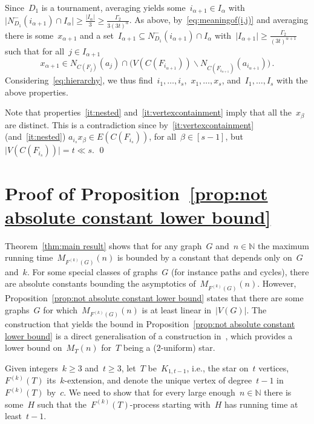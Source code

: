 \documentclass[oneside, 12pt]{amsart}
\numberwithin{equation}{section}
\numberwithin{figure}{section}
\let\setminus=\smallsetminus
\theoremstyle{plain}
\theoremstyle{note}
\theoremstyle{remark}
\begin{document}
    Since~$D_1$ is a tournament, averaging yields some~$i_{\alpha+1}\in I_{\alpha}$ with~$\vert N_{D_1}^-(i_{\alpha+1})\cap I_{\alpha}\vert\geq\frac{\vert I_{\alpha}\vert}{3}\geq\frac{\Gamma_2}{3(3t)^{\alpha}}$.
    As above, by~\eqref{eq:meaningof(i,j)} and averaging there is some~$x_{\alpha+1}$ and a set~$I_{\alpha+1}\subseteq N_{D_1}^-(i_{\alpha+1})\cap I_{\alpha}$ with~$\vert I_{\alpha+1}\vert\geq\frac{\Gamma_2}{(3t)^{\alpha+1}}$ such that for all~$j\in I_{\alpha+1}$ $$x_{\alpha+1}\in N_{C(F_j)}(a_j)\cap\big(V(C(F_{i_{\alpha+1}}))\setminus N_{C(F_{i_{\alpha+1}})}(a_{i_{\alpha+1}})\big)\,.$$
    Considering~\eqref{eq:hierarchy}, we thus find~$i_1,\dots,i_s$,~$x_1,\dots,x_s$, and~$I_1,\dots,I_s$ with the above properties.

    Note that properties~\eqref{it:nested} and~\eqref{it:vertexcontainment} imply that all the~$x_{\beta}$ are distinct.
    This is a contradiction since by~\eqref{it:vertexcontainment} (and~\eqref{it:nested}) $a_{i_s}x_{\beta}\in E(C(F_{i_s}))$, for all~$\beta\in[s-1]$, but~$\vert V(C(F_{i_s}))\vert=t\ll s$.
    \qed
	
	\section{Proof of Proposition~\ref{prop:not absolute constant lower bound}}\label{sec:prop}
	
	Theorem~\ref{thm:main result} shows that for any graph~$G$ and~$n\in\mathds{N}$ the maximum running time~$M_{F^{(k)}(G)}(n)$ is bounded by a constant that depends only on~$G$ and~$k$.
    For some special classes of graphs~$G$ (for instance paths and cycles), there are absolute constants bounding the asymptotics of~$M_{F^{(k)}(G)}(n)$.
    However, Proposition~\ref{prop:not absolute constant lower bound} states that there are some graphs~$G$ for which~$M_{F^{(k)}(G)}(n)$ is at least linear in~$\vert V(G)\vert$.
    The construction that yields the bound in Proposition~\ref{prop:not absolute constant lower bound} is a direct generalisation of a construction in~\cite{FMS:25}, which provides a lower bound on~$M_T(n)$ for~$T$ being a ($2$-uniform) star.
	
    Given integers~$k\geq3$ and~$t\geq 3$, let~$T$ be~$K_{1,t-1}$, i.e., the star on~$t$ vertices,~$F^{(k)}(T)$ its~$k$-extension, and denote the unique vertex of degree~$t-1$ in~$F^{(k)}(T)$ by~$c$.
    We need to show that for every large enough~$n\in\mathds{N}$ there is some~$H$ such that the~$F^{(k)}(T)$-process starting with~$H$ has running time at least~$t-1$.
    
\end{document}
